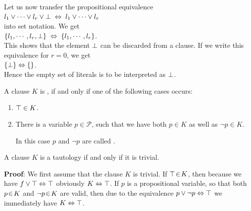 Let us now transfer the propositional equivalence
\\[0.2cm]
\hspace*{1.3cm}
$l_1 \vee \cdots \vee l_r \vee \bot \;\Leftrightarrow\; l_1 \vee \cdots \vee l_r$
\\[0.2cm]
into set notation.  We get
\\[0.2cm]
\hspace*{1.3cm}
$\{ l_1, \cdots, l_r, \bot \} \;\Leftrightarrow\; \{ l_1, \cdots, l_r \}$.
\\[0.2cm]
This shows that the element $\bot$ can be discarded from a clause.  If we write this equivalence for $r=0$,
we get
\\[0.2cm]
\hspace*{1.3cm}
$\{\bot \} \Leftrightarrow \{\}$.
\\[0.2cm]
Hence the empty set of literals is to be interpreted as $\bot$.

\begin{Definition}
  A clause $K$ is , if and only if one of the following cases occurs:
  \begin{enumerate}
  \item $\top \in K$.
  \item There is a variable  $p \in \mathcal{P}$, such that we have both $p \in K$ as well as $\neg p \in K$.

        In this case $p$ and $\neg p$ are called  .
        \eox
\end{enumerate}
\end{Definition}

\begin{Proposition} \label{satz:trivial}
  A clause $K$ is a tautology if and only if it is trivial.
\end{Proposition}
\textbf{Proof}:  We first assume that the clause $K$ is trivial.
If $\top \!\in\! K$, then because we have
$f \vee \top \Leftrightarrow \top$
obviously $K \Leftrightarrow \top$.   If $p$ is a propositional variable, so that
both $p \!\in\! K$ and $\neg p \!\in\! K$ are valid, then due to the equivalence $p \vee
\neg p \Leftrightarrow \top$ we immediately have $K \Leftrightarrow \top$.

